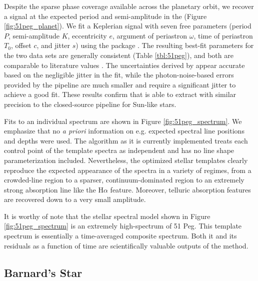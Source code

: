 \documentclass[twocolumn]{aastex62}
\newcommand{\Mdwarf}{Barnard's Star\xspace} %
\begin{document}
Despite the sparse phase coverage available across the planetary orbit, we recover a signal at the expected period and semi-amplitude in the \RVs (Figure \ref{fig:51peg_planet}). 
We fit a Keplerian signal with seven free parameters (period $P$, \RV semi-amplitude $K$, eccentricity $e$, argument of periastron $\omega$, time of periastron $T_0$, \RV offset $c$, and \RV jitter $s$) using the  package \citep{exoplanet}. 
The resulting best-fit parameters for the two data sets are generally consistent (Table \ref{tbl:51peg}), and both are comparable to literature values \citep{Mayor1995, Naef2004, Butler2006}. 
The \RV uncertainties derived by \wobble appear accurate based on the negligible jitter in the fit, while the photon-noise-based \RV errors provided by the \HARPS pipeline are much smaller and require a significant jitter to achieve a good fit. 
These results confirm that \wobble is able to extract \RVs with similar precision to the closed-source \HARPS pipeline for Sun-like stars.


Fits to an individual spectrum are shown in Figure \ref{fig:51peg_spectrum}. 
We emphasize that no \textit{a priori} information on e.g. expected spectral line positions and depths were used. 
The \wobble algorithm as it is currently implemented treats each control point of the template spectra as independent and has no line shape parameterization included. 
Nevertheless, the optimized stellar templates clearly reproduce the expected appearance of the spectra in a variety of regimes, from a crowded-line region to a sparser, continuum-dominated region to an extremely strong absorption line like the H$\alpha$ feature. 
Moreover, telluric absorption features are recovered down to a very small amplitude.

It is worthy of note that the stellar spectral model shown in Figure \ref{fig:51peg_spectrum} is an extremely high-\SNR spectrum of 51 Peg. 
This template spectrum is essentially a time-averaged composite spectrum. 
Both it and its residuals as a function of time are scientifically valuable outputs of the \wobble method.

\subsection{\Mdwarf}
\label{s:Mdwarf}
\end{document}
